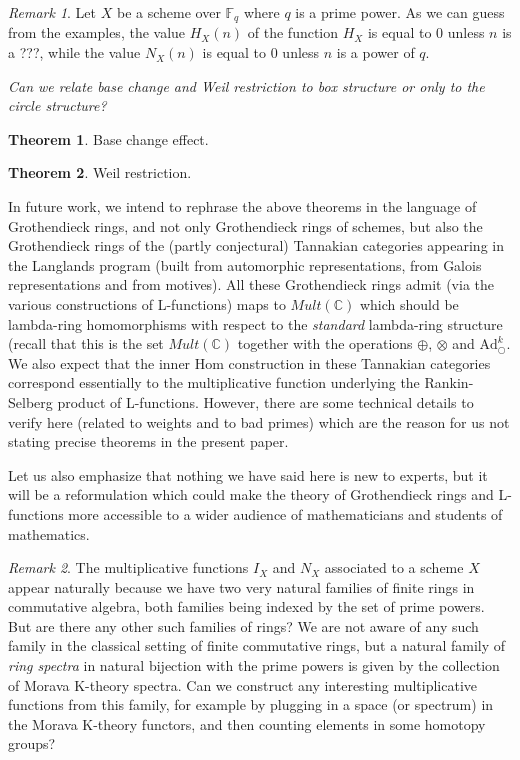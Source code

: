 \documentclass[a4paper]{article}
\theoremstyle{definition}
\newtheorem{theorem}{Theorem}[section]
\theoremstyle{remark}
\newtheorem*{remark}{Remark}
\newcommand{\adam}[1]{\text{Ad}^{#1}_{\bigcirc}}
\newcommand{\C}{\mathbb{C}}
\begin{document}
\begin{remark}
Let $X$ be a scheme over $\mathbb{F}_q$ where $q$ is a prime power. As we can guess from the examples, the value $H_X(n)$ of the function $H_X$ is equal to 0 unless $n$ is a ???, while the value $N_X(n)$ is equal to 0 unless $n$ is a power of $q$.
\end{remark}

\emph{Can we relate base change and Weil restriction to box structure or only to the circle structure?}

\begin{theorem}

Base change effect.
\end{theorem}


\begin{theorem}

Weil restriction.
\end{theorem}



In future work, we intend to rephrase the above theorems in the language of Grothendieck rings, and not only Grothendieck rings of schemes, but also the Grothendieck rings of the (partly conjectural) Tannakian categories appearing in the Langlands program (built from automorphic representations, from Galois representations and from motives). All these Grothendieck rings admit (via the various constructions of L-functions) maps to $Mult(\C)$ which should be lambda-ring homomorphisms with respect to the \emph{standard} lambda-ring structure (recall that this is the set $Mult(\C)$ together with the operations $\oplus$, $\otimes$ and $\adam{k}$. We also expect that the inner Hom construction in these Tannakian categories correspond essentially to the multiplicative function underlying the Rankin-Selberg product of L-functions. However, there are some technical details to verify here (related to weights and to bad primes) which are the reason for us not stating precise theorems in the present paper. 

Let us also emphasize that nothing we have said here is new to experts, but it will be a reformulation which could make the theory of Grothendieck rings and L-functions more accessible to a wider audience of mathematicians and students of mathematics. 



\begin{remark}
The multiplicative functions $I_X$ and $N_X$ associated to a scheme $X$ appear naturally because we have two very natural families of finite rings in commutative algebra, both families being indexed by the set of prime powers. But are there any other such families of rings? We are not aware of any such family in the classical setting of finite commutative rings, but a natural family of \emph{ring spectra} in natural bijection with the prime powers is given by the collection of Morava K-theory spectra. Can we construct any interesting multiplicative functions from this family, for example by plugging in a space (or spectrum) in the Morava K-theory functors, and then counting elements in some homotopy groups? 
\end{remark}
\end{document}
